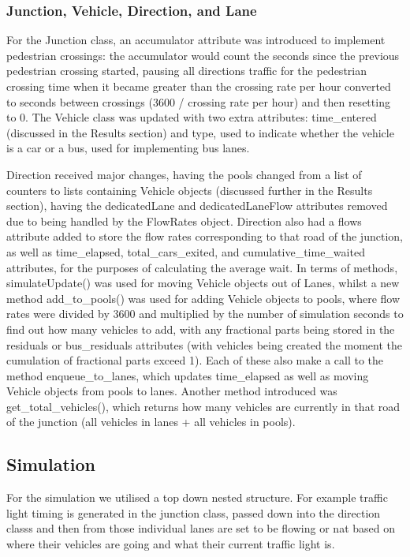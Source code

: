 \documentclass{article}
\begin{document}
    \subsubsection{Junction, Vehicle, Direction, and Lane}
    For the Junction class, an accumulator attribute was introduced to implement pedestrian crossings: the accumulator would
    count the seconds since the previous pedestrian crossing started, pausing all directions traffic for the pedestrian crossing
    time when it became greater than the crossing rate per hour converted to seconds between crossings (3600 / crossing rate per hour)
    and then resetting to 0. The Vehicle class was updated with two extra attributes: time\_entered (discussed in the Results section) and
    type, used to indicate whether the vehicle is a car or a bus, used for implementing bus lanes.

    Direction received major changes, having the pools changed from a list of counters to lists containing Vehicle objects (discussed further
    in the Results section), having the dedicatedLane and dedicatedLaneFlow attributes removed due to being handled by the FlowRates object.
    Direction also had a flows attribute added to store the flow rates corresponding to that road of the junction, as well as time\_elapsed,
    total\_cars\_exited, and cumulative\_time\_waited attributes, for the purposes of calculating the average wait. In terms of methods,
    simulateUpdate() was used for moving Vehicle objects out of Lanes, whilst a new method add\_to\_pools() was used for adding Vehicle objects
    to pools, where flow rates were divided by 3600 and multiplied by the number of simulation seconds to find out how many vehicles to add,
    with any fractional parts being stored in the residuals or bus\_residuals attributes (with vehicles being created the moment the cumulation
    of fractional parts exceed 1). Each of these also make a call to the method enqueue\_to\_lanes, which updates time\_elapsed as well as moving
    Vehicle objects from pools to lanes. Another method introduced was get\_total\_vehicles(), which returns how many vehicles are currently in
    that road of the junction (all vehicles in lanes + all vehicles in pools).

    \subsection{Simulation}

    For the simulation we utilised a top down nested structure. For example traffic light timing is generated in the
    junction class, passed down into the direction classs and then from those individual lanes are set to be flowing
    or nat based on where their vehicles are going and what their current traffic light is.
\end{document}

